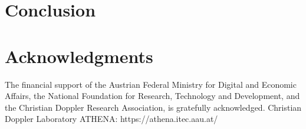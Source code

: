 \documentclass[sigconf, screen, review, anonymous]{acmart}
\begin{document}

\section{Conclusion}

\newpage

\section{Acknowledgments}
The financial support of the Austrian Federal Ministry for Digital and Economic Affairs, the National Foundation for Research, Technology and Development, and the Christian Doppler Research Association, is gratefully acknowledged. Christian Doppler Laboratory ATHENA: https://athena.itec.aau.at/




\end{document}
